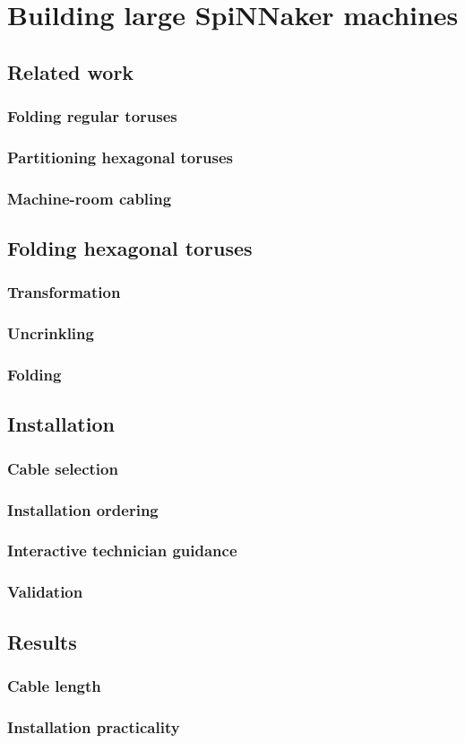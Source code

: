 \chapter{Building large SpiNNaker machines}

\section{Related work}
	\subsection{Folding regular toruses}
	\subsection{Partitioning hexagonal toruses}
	\subsection{Machine-room cabling}
\section{Folding hexagonal toruses}
	\subsection{Transformation}
	\subsection{Uncrinkling}
	\subsection{Folding}
\section{Installation}
	\subsection{Cable selection}
	\subsection{Installation ordering}
	\subsection{Interactive technician guidance}
	\subsection{Validation}
\section{Results}
	\subsection{Cable length}
	\subsection{Installation practicality}


